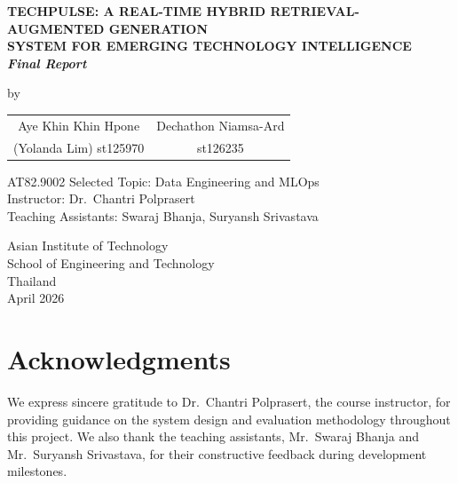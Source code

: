 \begin{titlepage}
\begin{center}
\vspace*{0.5cm}
{\fontsize{14}{18}\bfseries\MakeUppercase{%
TechPulse: A Real-Time Hybrid Retrieval-Augmented Generation\\
System for Emerging Technology Intelligence}\\[4pt]
\normalsize\mdseries\textit{Final Report
}}

\vspace{0.6cm}
{\normalsize by}

    \vspace{1em}
    \begin{tabular}{cc}
        Aye Khin Khin Hpone  & Dechathon Niamsa-Ard \\
        {\small (Yolanda Lim) st125970} & {\small st126235}
    \end{tabular}

\vfill

{\normalsize AT82.9002 Selected Topic: Data Engineering and MLOps}\\[6pt]
{\normalsize Instructor: Dr.\ Chantri Polprasert}\\[4pt]
{\normalsize Teaching Assistants: Swaraj Bhanja, Suryansh Srivastava}

\vfill
{\normalsize
Asian Institute of Technology\\[4pt]
School of Engineering and Technology\\[4pt]
Thailand\\[8pt]
April 2026
}
\end{center}
\end{titlepage}

\chapter*{Acknowledgments}

We express sincere gratitude to Dr.\ Chantri Polprasert, the course instructor, for providing guidance on the system design and evaluation methodology throughout this project. We also thank the teaching assistants, Mr.\ Swaraj Bhanja and Mr.\ Suryansh Srivastava, for their constructive feedback during development milestones.



